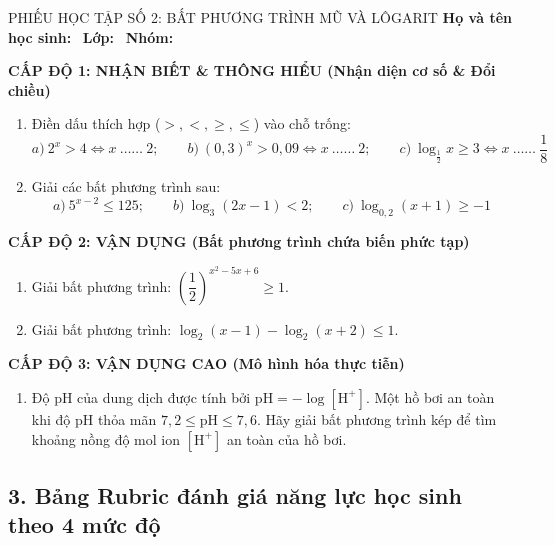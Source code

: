 \documentclass[12pt, a4paper]{article}
\begin{document}
\begin{pedabox}{PHIẾU HỌC TẬP SỐ 2: BẤT PHƯƠNG TRÌNH MŨ VÀ LÔGARIT}
\textbf{Họ và tên học sinh:} \dotfill \ \textbf{Lớp:} \dotfill \ \textbf{Nhóm:} \dotfill

\noindent \textbf{CẤP ĐỘ 1: NHẬN BIẾT \& THÔNG HIỂU (Nhận diện cơ số \& Đổi chiều)}
\begin{enumerate}[leftmargin=0.6cm]
    \item Điền dấu thích hợp ($>, <, \ge, \le$) vào chỗ trống:
    $$a) \ 2^x > 4 \iff x \ \dots\dots \ 2; \qquad b) \ (0{,}3)^x > 0{,}09 \iff x \ \dots\dots \ 2; \qquad c) \ \log_{\frac{1}{2}} x \ge 3 \iff x \ \dots\dots \ \dfrac{1}{8}$$
    \item Giải các bất phương trình sau:
    $$a) \ 5^{x - 2} \le 125; \qquad b) \ \log_3 (2x - 1) < 2; \qquad c) \ \log_{0{,}2} (x + 1) \ge -1$$
\end{enumerate}

\noindent \textbf{CẤP ĐỘ 2: VẬN DỤNG (Bất phương trình chứa biến phức tạp)}
\begin{enumerate}[leftmargin=0.6cm]
    \item Giải bất phương trình: $\left(\dfrac{1}{2}\right)^{x^2 - 5x + 6} \ge 1$.
    \item Giải bất phương trình: $\log_2 (x - 1) - \log_2 (x + 2) \le 1$.
\end{enumerate}

\noindent \textbf{CẤP ĐỘ 3: VẬN DỤNG CAO (Mô hình hóa thực tiễn)}
\begin{enumerate}[leftmargin=0.6cm]
    \item Độ pH của dung dịch được tính bởi $\text{pH} = -\log[\text{H}^+]$. Một hồ bơi an toàn khi độ pH thỏa mãn $7{,}2 \le \text{pH} \le 7{,}6$. Hãy giải bất phương trình kép để tìm khoảng nồng độ mol ion $[\text{H}^+]$ an toàn của hồ bơi.
\end{enumerate}
\end{pedabox}

\subsection*{3. Bảng Rubric đánh giá năng lực học sinh theo 4 mức độ}
\end{document}
